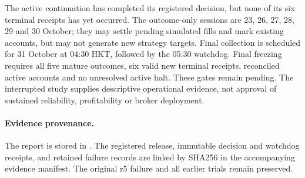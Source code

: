 The active continuation has completed its registered decision, but none of its
six terminal receipts has yet occurred. The outcome-only sessions are
23, 26, 27, 28, 29 and 30 October; they may settle pending simulated fills and
mark existing accounts, but may not generate new strategy targets. Final
collection is scheduled for 31 October at 04:30 HKT, followed by the 05:30
watchdog. Final freezing requires all five mature outcomes, six valid new
terminal receipts, reconciled active accounts and no unresolved active halt.
These gates remain pending. The interrupted study supplies descriptive
operational evidence, not approval of sustained reliability, profitability or
broker deployment.

\paragraph{Evidence provenance.}
The report is stored in
.
The registered release, immutable decision and watchdog receipts, and retained
failure records are linked by SHA256 in the accompanying evidence manifest.
The original r5 failure and all earlier trials remain preserved.
